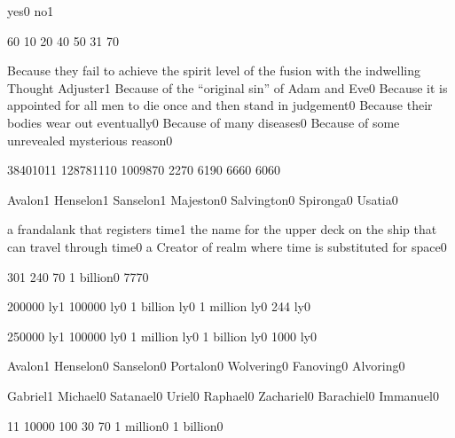 {yes}{0}
{no}{1}
\qstop

{6}{0}
{1}{0}
{2}{0}
{4}{0}
{5}{0}
{3}{1}
{7}{0}
\qstop

{Because they fail to achieve the spirit level of the fusion with the indwelling Thought Adjuster}{1}
{Because of the ``original sin'' of Adam and Eve}{0}
{Because it is appointed for all men to die once and then stand in judgement}{0}
{Because their bodies wear out eventually}{0}
{Because of many diseases}{0}
{Because of some unrevealed mysterious reason}{0}
\qstop

{3840101}{1}
{12878111}{0}
{100987}{0}
{227}{0}
{619}{0}
{666}{0}
{606}{0}
\qstop

{Avalon}{1}
{Henselon}{1}
{Sanselon}{1}
{Majeston}{0}
{Salvington}{0}
{Spironga}{0}
{Usatia}{0}
\qstop

{a frandalank that registers time}{1}
{the name for the upper deck on the ship that can travel through time}{0}
{a Creator of realm where time is substituted for space}{0}
\qstop

{30}{1}
{24}{0}
{7}{0}
{1 billion}{0}
{777}{0}
\qstop

{200000 ly}{1}
{100000 ly}{0}
{1 billion ly}{0}
{1 million ly}{0}
{244 ly}{0}
\qstop

{250000 ly}{1}
{100000 ly}{0}
{1 million ly}{0}
{1 billion ly}{0}
{1000 ly}{0}
\qstop

{Avalon}{1}
{Henselon}{0}
{Sanselon}{0}
{Portalon}{0}
{Wolvering}{0}
{Fanoving}{0}
{Alvoring}{0}
\qstop

{Gabriel}{1}
{Michael}{0}
{Satanael}{0}
{Uriel}{0}
{Raphael}{0}
{Zachariel}{0}
{Barachiel}{0}
{Immanuel}{0}
\qstop

{1}{1}
{1000}{0}
{10}{0}
{3}{0}
{7}{0}
{1 million}{0}
{1 billion}{0}
\qstop

